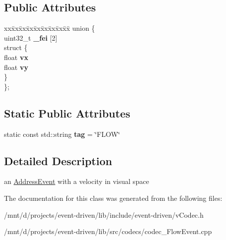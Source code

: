 \subsection*{Public Attributes}
\begin{DoxyCompactItemize}
\item 
\mbox{\label{classev_1_1FlowEvent_a6f7cdf3ec22ead9e2faaebd4a213279f}} 
\begin{tabbing}
xx\=xx\=xx\=xx\=xx\=xx\=xx\=xx\=xx\=\kill
union \{\\
\>uint32\_t {\bfseries \_fei} \mbox{[}2\mbox{]}\\
\mbox{\label{unionev_1_1FlowEvent_1_1_0D9_a174994f064562221bd6c96077d16eeb9}} 
\>struct \{\\
\>\>float {\bfseries vx}\\
\>\>float {\bfseries vy}\\
\>\} \\
\}; \\

\end{tabbing}\end{DoxyCompactItemize}
\subsection*{Static Public Attributes}
\begin{DoxyCompactItemize}
\item 
\mbox{\label{classev_1_1FlowEvent_a583ae9aaa6cbcbe1779eab526b5df1de}} 
static const std\+::string {\bfseries tag} = \char`\"{}F\+L\+OW\char`\"{}
\end{DoxyCompactItemize}


\subsection{Detailed Description}
an \hyperlink{classev_1_1AddressEvent}{Address\+Event} with a velocity in visual space 

The documentation for this class was generated from the following files\+:\begin{DoxyCompactItemize}
\item 
/mnt/d/projects/event-\/driven/lib/include/event-\/driven/v\+Codec.\+h\item 
/mnt/d/projects/event-\/driven/lib/src/codecs/codec\+\_\+\+Flow\+Event.\+cpp\end{DoxyCompactItemize}
